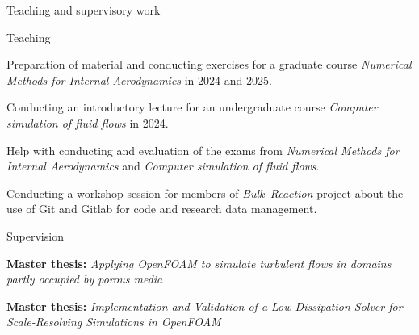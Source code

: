 \documentclass[a4paper, 10pt]{article}
\begin{document}
{	\begin{cvsection}{Teaching and supervisory work}
		\begin{entry}{Teaching}{}
			\par
			Preparation of material and conducting exercises for a graduate course
			\textit{Numerical Methods for Internal Aerodynamics} in 2024 and 2025.\par
			\vspace{0.25em}
			Conducting an introductory lecture for an undergraduate course
			\textit{Computer simulation of fluid flows} in 2024.\par
			\vspace{0.25em}
			Help with conducting and evaluation of the exams from \textit{Numerical
				Methods for Internal Aerodynamics} and \textit{Computer simulation of
				fluid flows}.\par
			\vspace{0.25em}
			Conducting a workshop session for members of \textit{Bulk--Reaction}
			project about the use of Git and Gitlab for code and
			research data management.\par
		\end{entry}
		\begin{entry}{Supervision}{}
			\par
			\textbf{Master thesis:} \textit{Applying OpenFOAM to simulate turbulent ﬂows in
				domains partly occupied by porous media}\par
			\vspace{0.25em}
			\textbf{Master thesis:} \textit{Implementation and Validation of a Low-Dissipation
				Solver for Scale-Resolving Simulations in OpenFOAM}\par

		\end{entry}


\end{cvsection}}
\end{document}
